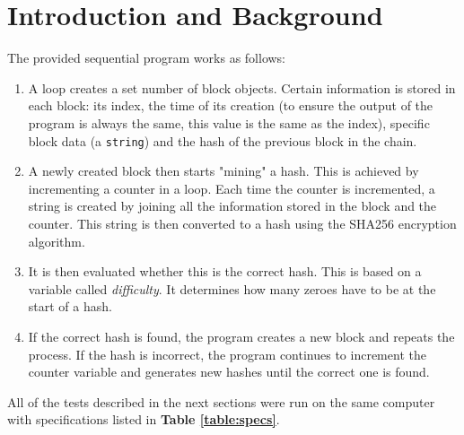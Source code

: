 \documentclass[12pt, a4paper]{article}
\title{\mytitle}
\author{\myauthor\hspace{1em}\\\contact\\Edinburgh Napier University\hspace{0.5em}-\hspace{0.5em}\mymodule}
\date{}
\begin{document}
    \maketitle   
    \clearpage

    \begin{abstract}    
        The aim of this report is to describe attempts at improving the performance of a blockchain simulation using CPU-based concurrency methods. The techniques used were: manual multithreading, OpenMP and \texttt{std::future}s.
    \end{abstract}

    \section{Introduction and Background}
    The provided sequential program works as follows:
    \begin{enumerate}[leftmargin=*]
        \item A loop creates a set number of block objects. Certain information is stored in each block: its index, the time of its creation (to ensure the output of the program is always the same, this value is the same as the index), specific block data (a \texttt{string}) and the hash of the previous block in the chain.
        \item A newly created block then starts "mining" a hash. This is achieved by incrementing a counter in a loop. Each time the counter is incremented, a string is created by joining all the information stored in the block and the counter. This string is then converted to a hash using the SHA256 encryption algorithm. 
        \item It is then evaluated whether this is the correct hash. This is based on a variable called \textit{difficulty}. It determines how many zeroes have to be at the start of a hash.
        \item If the correct hash is found, the program creates a new block and repeats the process. If the hash is incorrect, the program continues to increment the counter variable and generates new hashes until the correct one is found.
    \end{enumerate}
    
    All of the tests described in the next sections were run on the same computer with specifications listed in \textbf{Table \ref{table:specs}}.
\end{document}
